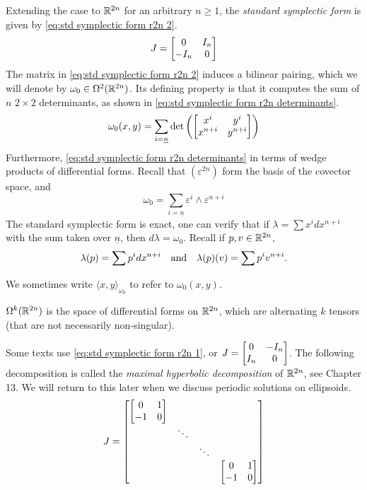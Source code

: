 \documentclass[../main-v2-manifolds.tex]{subfiles}
\begin{document}
Extending the case to ${\mathbb{R}^{2n}}$ for an arbitrary $n\geq 1$, the \emph{standard symplectic form} is given by \cref{eq:std symplectic form r2n 2}. 
\begin{equation}
    J =\begin{bmatrix}
        \admat[0]{I_n,-I_n}
    \end{bmatrix}
    \label{eq:std symplectic form r2n 2}
\end{equation}
The matrix in \cref{eq:std symplectic form r2n 2} induces a bilinear pairing, which we will denote by $\omega_0\in \Omega^2({\mathbb{R}^{2n}})$. Its defining property is that it computes the sum of $n$ $2\times 2$ determinants, as shown in \cref{eq:std symplectic form r2n determinants}. 
\begin{equation}
    \omega_0(x,y) = \sum_{i=\underline{n}}\det\qty(\mqty[x^i & y^i \\ x^{n+i} & y^{n+i}])
    \label{eq:std symplectic form r2n determinants}
\end{equation}
Furthermore, \cref{eq:std symplectic form r2n determinants} in terms of wedge products of differential forms. Recall that $(\varepsilon^{\underline{2n}})$ form the basis of the covector space, and
\begin{equation}
    \omega_0 = \sum_{i=\underline{n}}\varepsilon^{i}\wedge\varepsilon^{n+i}
    \label{eq: std symplectic form r2n wedge products using covectors}
\end{equation}
The standard symplectic form is exact, one can verify that if $\lambda = \sum x^i dx^{n+i}$ with the sum taken over $\underline{n}$, then $d\lambda = \omega_0$. Recall if $p,v\in{\mathbb{R}^{2n}}$, 
\[
    \lambda(p) = \sum p^{i}dx^{n+i}\qqtext{and} \lambda(p)(v) = \sum p^{i}v^{n+i}.
\]
%
%
\begin{remark}
    We sometimes write $\langle x,y\rangle_{\omega_0}$ to refer to $\omega_0(x,y)$. 
\end{remark}
\begin{remark}
    $\Omega^k({\mathbb{R}^{2n}})$ is the space of differential forms on ${\mathbb{R}^{2n}}$, which are alternating $k$ tensors (that are not necessarily non-singular).
\end{remark}
\begin{remark}[Alternate $J$]
    Some texts use \cref{eq:std symplectic form r2n 1}, or $J = \mqty[0 & -I_n\\ I_n & 0]$. The following decomposition is called the \emph{maximal hyperbolic decomposition} of ${\mathbb{R}^{2n}}$, see \cite{Roman2007Advanced} Chapter 13. We will return to this later when we discuss periodic solutions on ellipsoids.
    \begin{equation}
    J = \begin{bmatrix}
        \dmat{\symatrix,\ddots,\ddots,\symatrix}
    \end{bmatrix}
    \label{eq:std symplectic form r2n 1}
\end{equation}
\end{remark}
\end{document}
